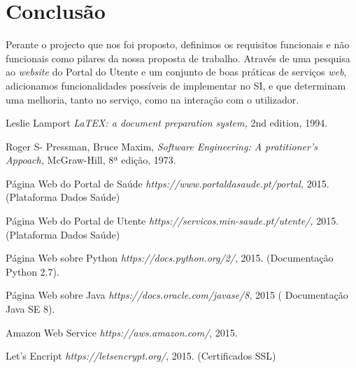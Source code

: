 \documentclass[12pt, a4paper, twoside]{report} %
\begin{document}

\chapter{Conclusão}

Perante o projecto que nos foi proposto, definimos os requisitos funcionais e não funcionais como pilares da nossa proposta de trabalho. 
Através de uma pesquisa ao \textit {website} do Portal do Utente e um conjunto de boas práticas de serviços \textit {web}, adicionamos funcionalidades possíveis de implementar no SI, e que determinam uma melhoria, tanto no serviço, como na interação com o utilizador.


\begin{thebibliography}{1}

 Leslie Lamport {\em LaTEX: a document preparation system,}
  2nd edition, 1994.

 Roger S- Pressman, Bruce Maxim, {\em Software Engineering: A pratitioner's Appoach,} McGraw-Hill, 8ª edição, 1973.

 Página Web do Portal de Saúde {\em https://www.portaldasaude.pt/portal, } 2015. (Plataforma Dados Saúde)

 Página Web do Portal de Utente {\em https://servicos.min-saude.pt/utente/,} 2015. (Plataforma Dados Saúde)

 Página Web sobre Python {\em https://docs.python.org/2/}, 2015. (Documentação Python 2.7).

 Página Web sobre Java {\em https://docs.oracle.com/javase/8}, 2015 ( Documentação Java SE 8).

 Amazon Web Service {\em https://aws.amazon.com/}, 2015.

 Let's Encript {\em https://letsencrypt.org/}, 2015. (Certificados SSL)

\end{thebibliography}
\end{document}

